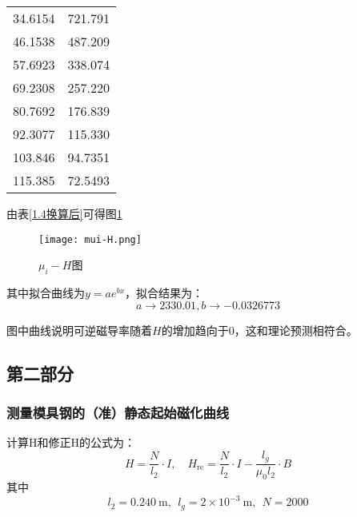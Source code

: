 \documentclass[11pt]{article}
\begin{document}
\begin{center}
\begin{minipage}{0.35\columnwidth}
\begin{table}[H]
\begin{tabular}{cc}
					34.6154 & 721.791 \\
					46.1538 & 487.209 \\
					57.6923 & 338.074 \\
					69.2308 & 257.220 \\
					80.7692 & 176.839 \\
					92.3077 & 115.330 \\
					103.846 & 94.7351 \\
					115.385 & 72.5493 \\
					\bottomrule
				\end{tabular}
			\end{table}
		\end{minipage}
	\end{center}
	
	由表\ref{1.4换算后}可得图\ref{fig:mui-H}
	
	\begin{figure}[H]
		\centering
		\texttt{[image: mui-H.png]}
		\caption{$\mu_i-H$图}
		\label{fig:mui-H}
	\end{figure}
	
	其中拟合曲线为$y=a e^{b x}$，拟合结果为：
	\[a \to 2330.01, b \to -0.0326773\]
	
	图中曲线说明可逆磁导率随着$H$的增加趋向于0，这和理论预测相符合。
	
	
	\subsection{第二部分}
	
	\subsubsection{测量模具钢的（准）静态起始磁化曲线}
	计算H和修正H的公式为：
	\begin{equation*}
		H = \frac{N}{l_2}\cdot I, \quad H_{\text{re}} = \frac{N}{l_2}\cdot I - \frac{l_g}{\mu_0 l_2}\cdot B 
	\end{equation*}
	其中
	\[l_2 = 0.240 \ \mathrm{m},\ \ l_g = 2 \times 10^{-3} \ \mathrm{m},\ \ N = 2000\]
	
\end{document}
